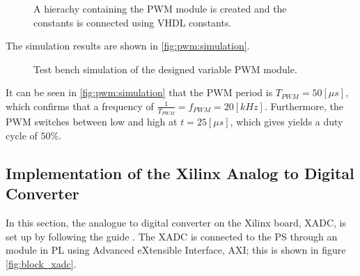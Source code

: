 \documentclass[../report.tex]{subfiles}
\begin{document}
\begin{figure}[H]
    \centering
    \noindent{}
    \caption{A hierachy containing the PWM module is created and the constants is connected using VHDL constants.}
    \label{fig:pwm:block:connected}
\end{figure}

The simulation results are shown in \autoref{fig:pwm:simulation}.

\begin{figure}[H]
    \centering
    \noindent{}
    \caption{Test bench simulation of the designed variable PWM module.}
    \label{fig:pwm:simulation}
\end{figure}
It can be seen in \autoref{fig:pwm:simulation} that the PWM period is $T_{PWM} = 50 [\mu s]$, which confirms that a frequency of $\frac{1}{T_{PWM}} = f_{PWM} = 20 [kHz]$. Furthermore, the PWM switches between low and high at $t = 25 [\mu s]$, which gives yields a duty cycle of $50 \%$.

\subsection{Implementation of the Xilinx Analog to Digital Converter} \label{subsec:adc}
In this section, the analogue to digital converter on the Xilinx board, XADC, is set up by following the guide \cite{xadc_sdu}. The XADC is connected to the PS through an module in PL using Advanced eXtensible Interface, AXI; this is shown in figure \ref{fig:block_xadc}.
\end{document}
